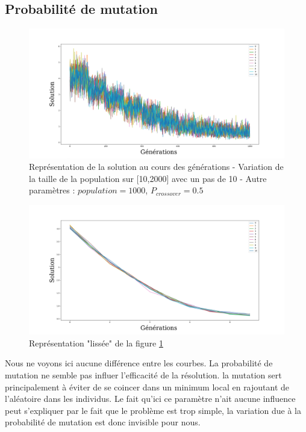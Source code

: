 \documentclass[12pt]{report}
\begin{document}
      \subsection{Probabilité de mutation}

      \begin{figure}[h]
        \centering
        \includegraphics[width=17cm]{img/evo_mutation_brut.png}
        \caption{Représentation de la solution au cours des générations - Variation de la taille de la population sur [10,2000] avec un pas de 10 - Autre paramètres : $population = 1000$, $P_{crossover} = 0.5$}
        \label{evo_mutation_brut}
      \end{figure}

      \begin{figure}[!]
        \centering
        \includegraphics[width=17cm]{img/evo_mutation_moy.png}
        \caption{Représentation "lissée" de la figure \ref{evo_mutation_brut}}
        \label{evo_mutation_moy}
      \end{figure}

      Nous ne voyons ici aucune différence entre les courbes. La probabilité de mutation ne semble pas influer l'efficacité de la résolution. la mutation sert principalement à éviter de se coincer dans un minimum local en rajoutant de l'aléatoire dans les individus. Le fait qu'ici ce paramètre n'ait aucune influence peut s'expliquer par le fait que le problème est trop simple, la variation due à la probabilité de mutation est donc invisible pour nous.
\end{document}
